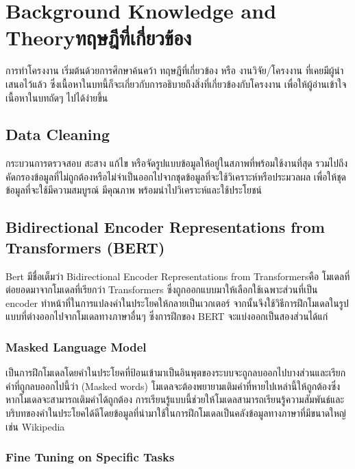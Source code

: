 \chapter{\ifenglish Background Knowledge and Theory\else ทฤษฎีที่เกี่ยวข้อง\fi}

การทำโครงงาน เริ่มต้นด้วยการศึกษาค้นคว้า ทฤษฎีที่เกี่ยวข้อง หรือ งานวิจัย/โครงงาน ที่เคยมีผู้นำเสนอไว้แล้ว ซึ่งเนื้อหาในบทนี้ก็จะเกี่ยวกับการอธิบายถึงสิ่งที่เกี่ยวข้องกับโครงงาน เพื่อให้ผู้อ่านเข้าใจเนื้อหาในบทถัดๆ ไปได้ง่ายขึ้น

\section{Data Cleaning}


\enskip \enskip \enskip กระบวนการตรวจสอบ สะสาง แก้ไข หรือจัดรูปแบบข้อมูลให้อยู่ในสภาพที่พร้อมใช้งานที่สุด
รวมไปถึงคัดกรองข้อมูลที่ไม่ถูกต้องหรือไม่จำเป็นออกไปจากชุดข้อมูลที่จะใช้วิเคราะห์หรือประมวลผล 
เพื่อให้ชุดข้อมูลที่จะใช้มีความสมบูรณ์ มีคุณภาพ พร้อมนำไปวิเคราะห์และใช้ประโยชน์


\section{Bidirectional Encoder Representations from Transformers (BERT)}
\enskip \enskip \enskip Bert มีชื่อเต็มว่า Bidirectional Encoder Representations from Transformersคือ 
โมเดลที่ต่อยอดมาจากโมเดลที่เรียกว่า Transformers ซึ่งถูกออกแบบมาให้เลือกใช้เฉพาะส่วนที่เป็น 
encoder ทำหน้าที่ในการแปลงคำในประโยคให้กลายเป็นเวกเตอร์ 
จากนั้นจึงใช้วิธีการฝึกโมเดลในรูปแบบที่ต่างออกไปจากโมเดลทางภาษาอื่นๆ ซึ่งการฝึกของ BERT จะแบ่งออกเป็นสองส่วนได้แก่

\subsection{Masked Language Model}

\enskip \enskip \enskip เป็นการฝึกโมเดลโดยคำในประโยคที่ป้อนเข้ามาเป็นอินพุตของระบบจะถูกลบออกไปบางส่วนและเรียกคำที่ถูกลบออกไปนี้ว่า 
(Masked words) โมเดลจะต้องพยายามเติมคำที่หายไปเหล่านี้ให้ถูกต้องซึ่งหากโมเดลจะสามารถเติมคำได้ถูกต้อง
การเรียนรู้แบบนี้ช่วยให้โมเดลสามารถเรียนรู้ความสัมพันธ์และบริบทของคำในประโยคได้ดีโดยข้อมูลที่นำมาใช้ในการฝึกโมเดลเป็นคลังข้อมูลทางภาษาที่มีขนาดใหญ่ 
เช่น Wikipedia

\subsection{Fine Tuning on Specific Tasks}

